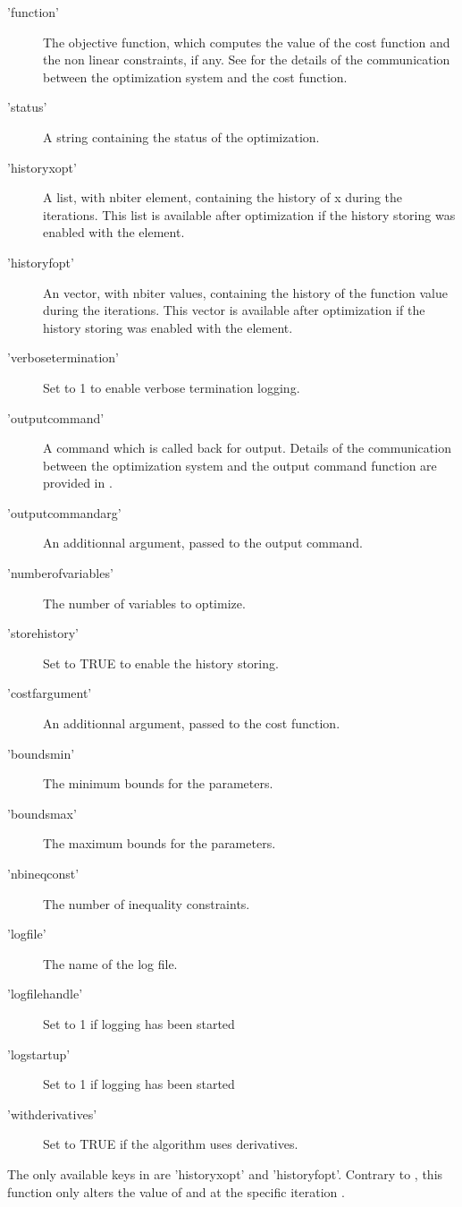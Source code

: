 \begin{Details}
\begin{description}
\item['function'] The objective function, which computes the value of the
cost function and the non linear constraints, if any. See
 for the details of
the communication between the optimization system and the cost function.
\item['status'] A string containing the status of the optimization.
\item['historyxopt'] A list, with nbiter element, containing the history
of x during the iterations. This list is available after optimization if
the history storing was enabled with the 
element.
\item['historyfopt'] An vector, with nbiter values, containing the history
of the function value during the iterations. This vector is available
after optimization if the history storing was enabled with the
 element.
\item['verbosetermination'] Set to 1 to enable verbose termination
logging.
\item['outputcommand'] A command which is called back for output. Details
of the communication between the optimization system and the output
command function are provided in      
.
\item['outputcommandarg'] An additionnal argument, passed to the output
command.
\item['numberofvariables'] The number of variables to optimize.
\item['storehistory'] Set to TRUE to enable the history storing.
\item['costfargument'] An additionnal argument, passed to the cost
function.
\item['boundsmin'] The minimum bounds for the parameters.
\item['boundsmax'] The maximum bounds for the parameters.
\item['nbineqconst'] The number of inequality constraints.
\item['logfile'] The name of the log file.
\item['logfilehandle'] Set to 1 if logging has been started
\item['logstartup'] Set to 1 if logging has been started
\item['withderivatives'] Set to TRUE if the algorithm uses derivatives.

\end{description}


The only available keys in  are 'historyxopt' and
'historyfopt'. Contrary to , this function only alters
the value of  and  at the specific
iteration .
\end{Details}
